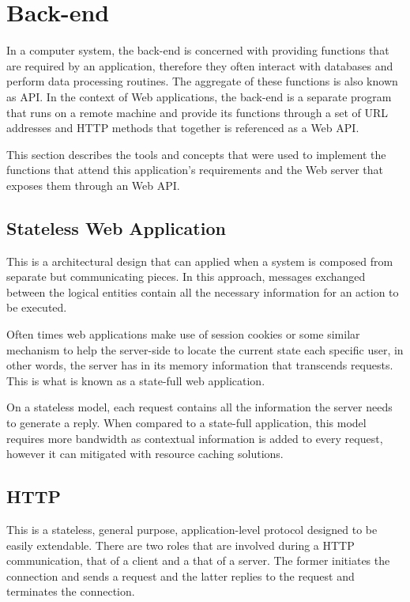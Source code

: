 \section{Back-end}\label{cha:concepts:sec:backend}
In a computer system, the back-end is concerned with providing functions that are required by an application, therefore they often interact with databases and perform data processing routines. The aggregate of these functions is also known as \gls{API}. In the context of Web applications, the back-end is a separate program that runs on a remote machine and provide its functions through a set of \gls{URL} addresses and \gls{HTTP} methods that together is referenced as a Web \gls{API}.

This section describes the tools and concepts that were used to implement the functions that attend this application's requirements and the Web server that exposes them through an Web \gls{API}.

\subsection{Stateless Web Application}
This is a architectural design that can applied when a system is composed from separate but communicating pieces. In this approach, messages exchanged between the logical entities contain all the necessary information for an action to be executed.

Often times web applications make use of session cookies or some similar mechanism to help the server-side to locate the current state each specific user, in other words, the server has in its memory information that transcends requests. This is what is known as a state-full web application.

On a stateless model, each request contains all the information the server needs to generate a reply. When compared to a state-full application, this model requires more bandwidth as contextual information is added to every request, however it can mitigated with resource caching solutions.

\subsection{HTTP}
This is a stateless, general purpose, application-level protocol designed to be easily extendable. There are two roles that are involved during a \gls{HTTP} communication, that of a client and a that of a server. The former initiates the connection and sends a request and the latter replies to the request and terminates the connection.

